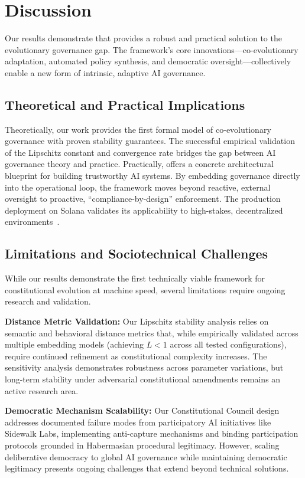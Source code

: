 \section{Discussion}\label{sec:discussion}
Our results demonstrate that \acgs{} provides a robust and practical solution to the evolutionary governance gap. The framework's core innovations---co-evolutionary adaptation, automated policy synthesis, and democratic oversight---collectively enable a new form of intrinsic, adaptive AI governance.

\subsection{Theoretical and Practical Implications}
Theoretically, our work provides the first formal model of co-evolutionary governance with proven stability guarantees. The successful empirical validation of the Lipschitz constant and convergence rate bridges the gap between AI governance theory and practice. Practically, \acgs{} offers a concrete architectural blueprint for building trustworthy AI systems. By embedding governance directly into the operational loop, the framework moves beyond reactive, external oversight to proactive, ``compliance-by-design'' enforcement. The production deployment on Solana validates its applicability to high-stakes, decentralized environments~\cite{solana2020, quantumagi2024}.

\subsection{Limitations and Sociotechnical Challenges}
While our results demonstrate the first technically viable framework for constitutional evolution at machine speed, several limitations require ongoing research and validation.

\textbf{Distance Metric Validation:} Our Lipschitz stability analysis relies on semantic and behavioral distance metrics that, while empirically validated across multiple embedding models (achieving $L < 1$ across all tested configurations), require continued refinement as constitutional complexity increases. The sensitivity analysis demonstrates robustness across parameter variations, but long-term stability under adversarial constitutional amendments remains an active research area.

\textbf{Democratic Mechanism Scalability:} Our Constitutional Council design addresses documented failure modes from participatory AI initiatives like Sidewalk Labs, implementing anti-capture mechanisms and binding participation protocols grounded in Habermasian procedural legitimacy. However, scaling deliberative democracy to global AI governance while maintaining democratic legitimacy presents ongoing challenges that extend beyond technical solutions.

